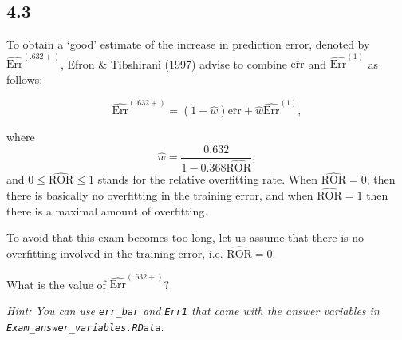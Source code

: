 \documentclass[]{article}
\begin{document}
\subsection{4.3}\label{section}

To obtain a `good' estimate of the increase in prediction error, denoted
by \(\widehat{\text{Err}}^{(.632+)}\), Efron \& Tibshirani (1997) advise
to combine \(\overline{\text{err}}\) and \(\widehat{\text{Err}}^{(1)}\)
as follows:

\begin{equation}
\widehat{\text{Err}}^{(.632+)} = (1 - \widehat{w}) \overline{\text{err}}  +  \widehat{w} \widehat{\text{Err}}^{(1)}, 
\end{equation}

where \[ \widehat{w} = \frac{0.632}{1 - 0.368 \widehat{\text{ROR}}},\]
and \(0 \leq \widehat{\text{ROR}} \leq 1\) stands for the relative
overfitting rate. When \(\widehat{\text{ROR}} = 0\), then there is
basically no overfitting in the training error, and when
\(\widehat{\text{ROR}} = 1\) then there is a maximal amount of
overfitting.

To avoid that this exam becomes too long, let us assume that there is no
overfitting involved in the training error, i.e.
\(\widehat{\text{ROR}} = 0\).

What is the value of \(\widehat{\text{Err}}^{(.632+)}\)?

\emph{Hint: You can use \texttt{err\_bar} and \texttt{Err1} that came
with the answer variables in \texttt{Exam\_answer\_variables.RData}.}
\end{document}
